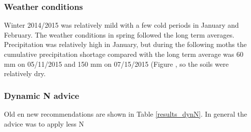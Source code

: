\documentclass[10pt,twoside,dutch,english]{report}
\begin{document}
\subsubsection{Weather conditions}
 Winter 2014/2015 was relatively mild with a few cold periods in January and February. The weather conditions in spring followed the long term averages. Precipitation was relatively high in January, but during the following moths the cumulative precipitation shortage compared with the long term average was 60 mm on 05/11/2015 and 150 mm on 07/15/2015 (Figure , so the soils were relatively dry. 

\subsubsection{Dynamic N advice}
Old en new recommendations are shown in Table \ref{results_dynN}. In general the advice was to apply less N
\end{document}
